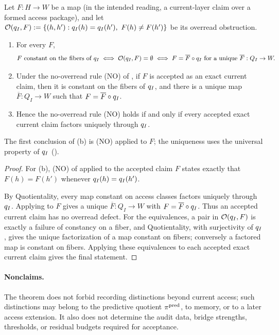 \begin{theorem}\label{thm:F11}
Let \(F:H\to W\) be a map (in the intended reading, a current-layer claim over a
formed access package), and let
\(\mathcal O(q_I,F):=\{(h,h'):q_I(h)=q_I(h'),\ F(h)\ne F(h')\}\)
be its overread obstruction.
\begin{enumerate}[label=(\alph*)]
\item For every \(F\),
\[
  F\ \text{constant on the fibers of}\ \accessQ
  \iff \mathcal O(\accessQ,F)=\emptyset
  \iff F=\overline F\circ\accessQ\ \text{for a unique}\ \overline F:Q_I\to W .
\]
\item Under the no-overread rule (NO) of , if \(F\) is
  accepted as an exact current claim, then it is constant on the fibers of
  \(q_I\), and there is a unique map \(\overline F:Q_I\to W\) such that
  \(F=\overline F\circ q_I\).
\item Hence the no-overread rule (NO) holds if and only if every accepted
  exact current claim factors uniquely through
  \(q_I\).
\end{enumerate}
The first conclusion of (b) is (NO) applied to \(F\); the uniqueness uses the
universal property of \(q_I\) ().
\end{theorem}
\begin{proof}
For (b), (NO) of  applied to the accepted claim \(F\) states exactly that \(F(h)=F(h')\) whenever \(q_I(h)=q_I(h')\).

By Quotientality, every map constant on access classes factors
uniquely through \(q_I\).  Applying  to \(F\)
gives a unique \(\overline F:Q_I\to W\) with
\(F=\overline F\circ q_I\).  Thus an accepted current claim has
no overread defect. For the equivalences, a pair in \(\mathcal O(q_I,F)\)
is exactly a failure of constancy on a fiber, and Quotientality, with
surjectivity of \(q_I\), gives the unique factorization of a map constant
on fibers; conversely a factored map is constant on fibers. Applying these
equivalences to each accepted exact current claim gives the final
statement.
\end{proof}

\paragraph{Nonclaims.} The theorem does not forbid recording distinctions beyond
current access; such distinctions may belong to the predictive
quotient \(\pi^{\mathrm{pred}}\), to memory, or to a later access extension.  It
also does not determine the audit data, bridge strengths, thresholds,
or residual budgets required for acceptance.

